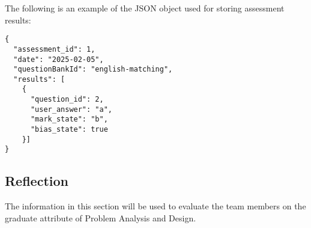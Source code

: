\documentclass[12pt, titlepage]{article}
\begin{document}
The following is an example of the JSON object used for storing assessment results:

\begin{verbatim}
{
  "assessment_id": 1,
  "date": "2025-02-05",
  "questionBankId": "english-matching",
  "results": [
    {
      "question_id": 2,
      "user_answer": "a",
      "mark_state": "b",
      "bias_state": true
    }]
}
\end{verbatim}

\subsection*{Reflection}

The information in this section will be used to evaluate the team members on the
graduate attribute of Problem Analysis and Design.


\end{document}
